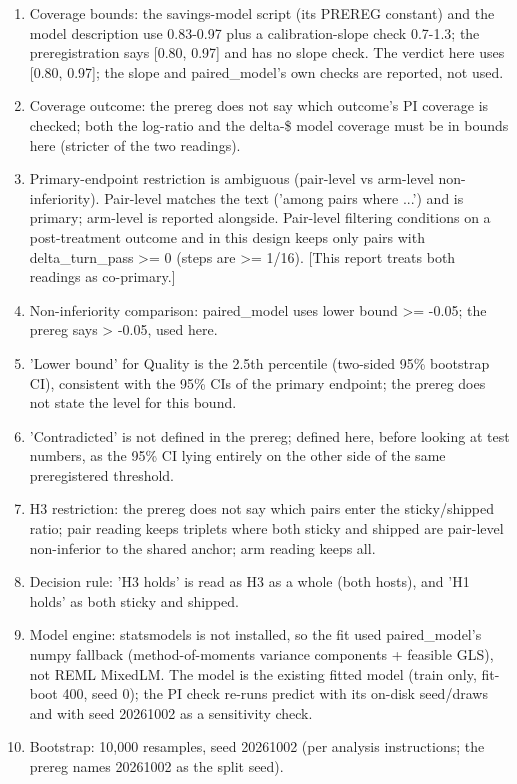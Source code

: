 \begin{enumerate}[leftmargin=1.4em]
\item Coverage bounds: the savings-model script (its PREREG constant) and the model description use 0.83-0.97 plus a calibration-slope check 0.7-1.3; the preregistration says [0.80, 0.97] and has no slope check. The verdict here uses [0.80, 0.97]; the slope and paired\_model's own checks are reported, not used.
\item Coverage outcome: the prereg does not say which outcome's PI coverage is checked; both the log-ratio and the delta-\$ model coverage must be in bounds here (stricter of the two readings).
\item Primary-endpoint restriction is ambiguous (pair-level vs arm-level non-inferiority). Pair-level matches the text ('among pairs where ...') and is primary; arm-level is reported alongside. Pair-level filtering conditions on a post-treatment outcome and in this design keeps only pairs with delta\_turn\_pass >= 0 (steps are >= 1/16). [This report treats both readings as co-primary.]
\item Non-inferiority comparison: paired\_model uses lower bound >= -0.05; the prereg says > -0.05, used here.
\item 'Lower bound' for Quality is the 2.5th percentile (two-sided 95\% bootstrap CI), consistent with the 95\% CIs of the primary endpoint; the prereg does not state the level for this bound.
\item 'Contradicted' is not defined in the prereg; defined here, before looking at test numbers, as the 95\% CI lying entirely on the other side of the same preregistered threshold.
\item H3 restriction: the prereg does not say which pairs enter the sticky/shipped ratio; pair reading keeps triplets where both sticky and shipped are pair-level non-inferior to the shared anchor; arm reading keeps all.
\item Decision rule: 'H3 holds' is read as H3 as a whole (both hosts), and 'H1 holds' as both sticky and shipped.
\item Model engine: statsmodels is not installed, so the fit used paired\_model's numpy fallback (method-of-moments variance components + feasible GLS), not REML MixedLM. The model is the existing fitted model (train only, fit-boot 400, seed 0); the PI check re-runs predict with its on-disk seed/draws and with seed 20261002 as a sensitivity check.
\item Bootstrap: 10,000 resamples, seed 20261002 (per analysis instructions; the prereg names 20261002 as the split seed).
\end{enumerate}
